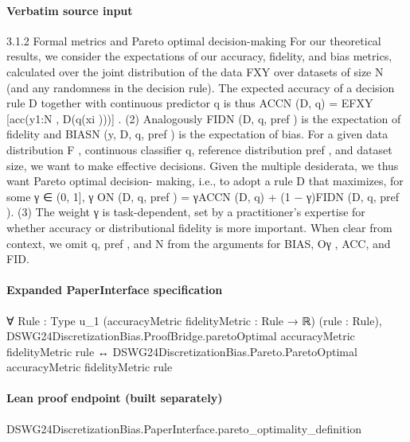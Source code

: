 \documentclass[10pt]{article}
\begin{document}
\paragraph{Verbatim source input}
\begin{ReviewVerbatim}
3.1.2    Formal metrics and Pareto optimal decision-making
For our theoretical results, we consider the expectations of our accuracy, fidelity, and bias metrics, calculated
over the joint distribution of the data FXY over datasets of size N (and any randomness in the decision
rule). The expected accuracy of a decision rule D together with continuous predictor q is thus
                                     ACCN (D, q) = EFXY [acc(y1:N , D({q(xi )}))] .                                            (2)
Analogously FIDN (D, q, pref ) is the expectation of fidelity and BIASN (y, D, q, pref ) is the expectation of bias.
   For a given data distribution F , continuous classifier q, reference distribution pref , and dataset size, we
want to make effective decisions. Given the multiple desiderata, we thus want Pareto optimal decision-
making, i.e., to adopt a rule D that maximizes, for some γ ∈ (0, 1],
                              γ
                             ON (D, q, pref ) = γACCN (D, q) + (1 − γ)FIDN (D, q, pref ).                                      (3)
The weight γ is task-dependent, set by a practitioner’s expertise for whether accuracy or distributional
fidelity is more important.
    When clear from context, we omit q, pref , and N from the arguments for BIAS, Oγ , ACC, and FID.
\end{ReviewVerbatim}


\paragraph{Expanded PaperInterface specification}
\begin{ReviewVerbatim}
∀ {Rule : Type u_1} (accuracyMetric fidelityMetric : Rule → ℝ) (rule : Rule),
  DSWG24DiscretizationBias.ProofBridge.paretoOptimal accuracyMetric fidelityMetric rule ↔
    DSWG24DiscretizationBias.Pareto.ParetoOptimal accuracyMetric fidelityMetric rule
\end{ReviewVerbatim}

\paragraph{Lean proof endpoint (built separately)}\begin{ReviewVerbatim}
DSWG24DiscretizationBias.PaperInterface.pareto_optimality_definition
\end{ReviewVerbatim}
\end{document}
